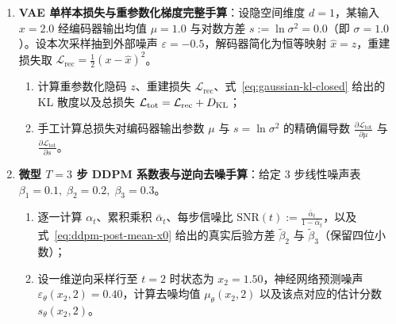 \begin{enumerate}
  \item[\textbf{5.6.1}] \textbf{VAE 单样本损失与重参数化梯度完整手算}：设隐空间维度 $d = 1$，某输入 $x = 2.0$ 经编码器输出均值 $\mu = 1.0$ 与对数方差 $s := \ln \sigma^2 = 0.0$（即 $\sigma = 1.0$）。设本次采样抽到外部噪声 $\varepsilon = -0.5$，解码器简化为恒等映射 $\hat{x} = z$，重建损失取 $\mathcal{L}_{\text{rec}} = \frac{1}{2}(x - \hat{x})^2$。
  \begin{enumerate}
    \item 计算重参数化隐码 $z$、重建损失 $\mathcal{L}_{\text{rec}}$、式~\eqref{eq:gaussian-kl-closed} 给出的 KL 散度以及总损失 $\mathcal{L}_{\text{tot}} = \mathcal{L}_{\text{rec}} + D_{\mathrm{KL}}$；
    \item 手工计算总损失对编码器输出参数 $\mu$ 与 $s = \ln \sigma^2$ 的精确偏导数 $\frac{\partial \mathcal{L}_{\text{tot}}}{\partial \mu}$ 与 $\frac{\partial \mathcal{L}_{\text{tot}}}{\partial s}$。
  \end{enumerate}

  \item[\textbf{5.6.2}] \textbf{微型 $T = 3$ 步 DDPM 系数表与逆向去噪手算}：给定 3 步线性噪声表 $\beta_1 = 0.1,\; \beta_2 = 0.2,\; \beta_3 = 0.3$。
  \begin{enumerate}
    \item 逐一计算 $\alpha_t$、累积乘积 $\bar{\alpha}_t$、每步信噪比 $\mathrm{SNR}(t) := \frac{\bar{\alpha}_t}{1 - \bar{\alpha}_t}$，以及式~\eqref{eq:ddpm-post-mean-x0} 给出的真实后验方差 $\tilde{\beta}_2$ 与 $\tilde{\beta}_3$（保留四位小数）；
    \item 设一维逆向采样行至 $t = 2$ 时状态为 $x_2 = 1.50$，神经网络预测噪声 $\varepsilon_\theta(x_2, 2) = 0.40$，计算去噪均值 $\mu_\theta(x_2, 2)$ 以及该点对应的估计分数 $s_\theta(x_2, 2)$。
  \end{enumerate}
\end{enumerate}


